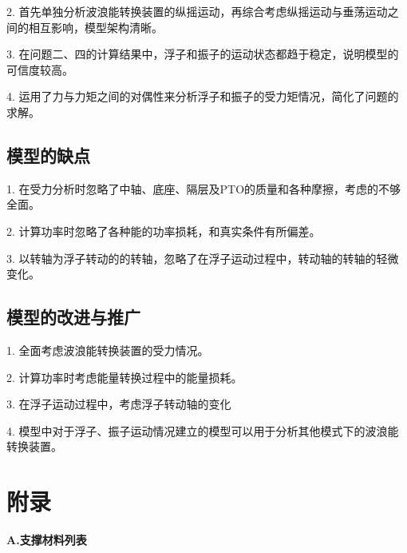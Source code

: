 \documentclass{my_paper}
\begin{document}
2. 首先单独分析波浪能转换装置的纵摇运动，再综合考虑纵摇运动与垂荡运动之间的相互影响，模型架构清晰。

3. 在问题二、四的计算结果中，浮子和振子的运动状态都趋于稳定，说明模型的可信度较高。

4. 运用了力与力矩之间的对偶性来分析浮子和振子的受力矩情况，简化了问题的求解。
\subsection{模型的缺点}

1. 在受力分析时忽略了中轴、底座、隔层及PTO的质量和各种摩擦，考虑的不够全面。

2. 计算功率时忽略了各种能的功率损耗，和真实条件有所偏差。

3. 以转轴为浮子转动的的转轴，忽略了在浮子运动过程中，转动轴的转轴的轻微变化。
\subsection{模型的改进与推广}
1. 全面考虑波浪能转换装置的受力情况。

2. 计算功率时考虑能量转换过程中的能量损耗。

3. 在浮子运动过程中，考虑浮子转动轴的变化

4. 模型中对于浮子、振子运动情况建立的模型可以用于分析其他模式下的波浪能转换装置。

\begin{center}
\end{center}


\newpage
\section{附录}

\noindent \large \textbf{A.支撑材料列表} \\ %
\end{document}
